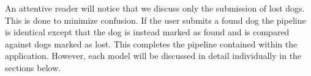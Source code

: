 \documentclass{article}
\begin{document}
An attentive reader will notice that we discuss only the submission of lost dogs.  This is done to minimize confusion.  If the user submits a found dog the pipeline is identical except that the dog is instead marked as found and is compared against dogs marked as lost.  This completes the pipeline contained within the application.  However, each model will be discussed in detail individually in the sections below.
\end{document}
